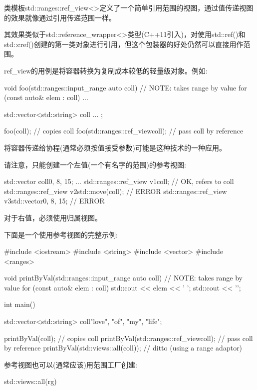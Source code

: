 类模板std::ranges::ref\_view<>定义了一个简单引用范围的视图，通过值传递视图的效果就像通过引用传递范围一样。

其效果类似于std::reference\_wrapper<>类型(C++11引入)，对使用std::ref()和std::cref()创建的第一类对象进行引用，但这个包装器的好处仍然可以直接用作范围。

ref\_view的用例是将容器转换为复制成本较低的轻量级对象。例如:

\begin{cpp}
void foo(std::ranges::input_range auto coll) // NOTE: takes range by value
{
	for (const auto& elem : coll) {
		...
	}
}

std::vector<std::string> coll{ ... };

foo(coll); // copies coll
foo(std::ranges::ref_view{coll}); // pass coll by reference
\end{cpp}

将容器传递给协程(通常必须按值接受参数)可能是这种技术的一种应用。

请注意，只能创建一个左值(一个有名字的范围)的参考视图:

\begin{cpp}
std::vector coll{0, 8, 15};
...
std::ranges::ref_view v1{coll}; // OK, refers to coll
std::ranges::ref_view v2{std::move(coll)}; // ERROR
std::ranges::ref_view v3{std::vector{0, 8, 15}}; // ERROR
\end{cpp}

对于右值，必须使用归属视图。

下面是一个使用参考视图的完整示例:


\begin{cpp}
#include <iostream>
#include <string>
#include <vector>
#include <ranges>

void printByVal(std::ranges::input_range auto coll) // NOTE: takes range by value
{
	for (const auto& elem : coll) {
		std::cout << elem << ' ';
	}
	std::cout << '\n';
}

int main()
{
	std::vector<std::string> coll{"love", "of", "my", "life"};
	
	printByVal(coll); // copies coll
	printByVal(std::ranges::ref_view{coll}); // pass coll by reference
	printByVal(std::views::all(coll)); // ditto (using a range adaptor)
}
\end{cpp}


参考视图也可以(通常应该)用范围工厂创建:

\begin{cpp}
std::views::all(rg)
\end{cpp}

